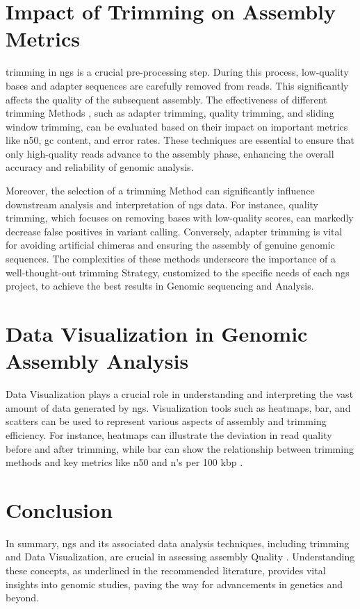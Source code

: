 \section{Impact of Trimming on Assembly Metrics}

\gls{trimming} in \gls{ngs} is a crucial pre-processing step. During this process, low-quality bases and adapter sequences are carefully removed from \gls{read}s. This significantly affects the quality of the subsequent \gls{assembly}. The effectiveness of different \gls{trimming} Methods \cite{fastp}, such as adapter trimming, quality trimming, and sliding window trimming, can be evaluated based on their impact on important \gls{metrics} like \gls{n50}, \gls{gc} content, and error rates. These techniques are essential to ensure that only high-quality \gls{read}s advance to the \gls{assembly} phase, enhancing the overall accuracy and reliability of genomic analysis.

Moreover, the selection of a \gls{trimming} Method can significantly influence downstream analysis and interpretation of \gls{ngs} data. For instance, quality trimming, which focuses on removing bases with low-quality scores, can markedly decrease false positives in variant calling. Conversely, adapter trimming is vital for avoiding artificial chimeras and ensuring the assembly of genuine genomic sequences. The complexities of these methods underscore the importance of a well-thought-out \gls{trimming} Strategy, customized to the specific needs of each \gls{ngs} project, to achieve the best results in Genomic \gls{sequencing} and Analysis.

\section{Data Visualization in Genomic Assembly Analysis}

Data Visualization \cite{Chen2007} plays a crucial role in understanding and interpreting the vast amount of data generated by \gls{ngs}.  Visualization tools such as \gls{heatmap}s, \gls{bar}, and \gls{scatter}s can be used to represent various aspects of \gls{assembly} and \gls{trimming} efficiency. For instance, \gls{heatmap}s can illustrate the \gls{deviation} in \gls{read} quality before and after \gls{trimming}, while \gls{bar} can show the relationship between trimming methods and key \gls{metrics} like \gls{n50} and \gls{n's per 100 kbp} \cite{quast}.

\section{Conclusion}

In summary, \gls{ngs} and its associated data analysis techniques, including \gls{trimming} and Data Visualization, are crucial in assessing \gls{assembly} Quality \cite{Wang2022}. Understanding these concepts, as underlined in the recommended literature, provides vital insights into genomic studies, paving the way for advancements in genetics and beyond.
